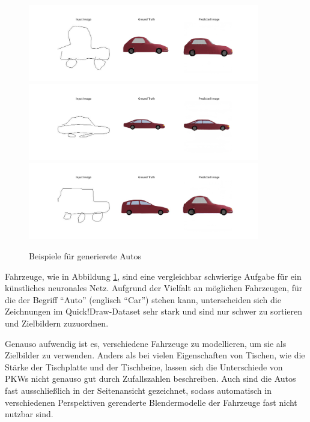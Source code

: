 \begin{figure}[h]
	\centering
	\includegraphics[width=0.9\textwidth]{bilder/pix2pix_progress/car_small.png}
	\includegraphics[width=0.9\textwidth]{bilder/pix2pix_progress/car_limo.png}
	\includegraphics[width=0.9\textwidth]{bilder/pix2pix_progress/car_kombi.png}
	\caption[Generierte Autos]{Beispiele für generierete Autos}
	\label{fig:pix2pixcars}
\end{figure}

Fahrzeuge, wie in Abbildung \ref{fig:pix2pixcars}, sind eine vergleichbar schwierige Aufgabe für ein künstliches neuronales Netz. Aufgrund der Vielfalt an möglichen Fahrzeugen, für die der Begriff ``Auto'' (englisch ``Car'') stehen kann, unterscheiden sich die Zeichnungen im Quick!Draw-Dataset sehr stark und sind nur schwer zu sortieren und Zielbildern zuzuordnen.

Genauso aufwendig ist es, verschiedene Fahrzeuge zu modellieren, um sie als Zielbilder zu verwenden. Anders als bei vielen Eigenschaften von Tischen, wie die Stärke der Tischplatte und der Tischbeine, lassen sich die Unterschiede von PKWs nicht genauso gut durch Zufallszahlen beschreiben. Auch sind die Autos fast ausschließlich in der Seitenansicht gezeichnet, sodass automatisch in verschiedenen Perspektiven gerenderte Blendermodelle der Fahrzeuge fast nicht nutzbar sind.

